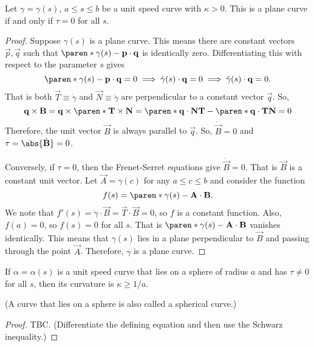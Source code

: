 \documentclass[11pt]{penrose}
\newcommand{\vT}{\vec{T}}
\newcommand{\vN}{\vec{N}}
\newcommand{\vB}{\vec{B}}
\begin{document}

\begin{nthm}
    Let $\gamma = \gamma(s)$, $a \leq s \leq b$ be a unit speed curve with $\kappa > 0$. This is a plane curve if and only if $\tau = 0$ for all $s$.
\end{nthm}
\begin{proof}
    Suppose $\gamma(s)$ is a plane curve. This means there are constant vectors $\vec{p}, \vec{q}$ such that $\paren*{\gamma(s) - \vec{p}} \cdot \vec{q}$ is identically zero. Differentiating this with respect to the parameter $s$ gives
    \begin{equation}
        \paren*{\gamma(s) - \vec{p}} \cdot \vec{q} = 0
        \implies
        \dot{\gamma}(s) \cdot \vec{q} = 0
        \implies
        \ddot{\gamma}(s) \cdot \vec{q} = 0.
    \end{equation}
    That is both $\vT \equiv \dot{\gamma}$ and $\vN \equiv \ddot{\gamma}$ are perpendicular to a constant vector $\vec{q}$. So,
    \begin{equation}
         \vec{q} \times \vB
        = \vec{q} \times \paren*{\vT \times \vN}
        = \paren*{\vec{q} \cdot \vN} \vT - \paren*{\vec{q} \cdot \vT} \vN
        = 0
    \end{equation}
    Therefore, the unit vector $\vB$ is always parallel to $\vec{q}$. So, $\dot{\vB} = 0$ and $\tau = \abs{\dot{\vB}} = 0$.

    Conversely, if $\tau = 0$, then the Frenet-Serret equations give $\dot{\vB} = 0$. That is $\vB$ is a constant unit vector. Let $\vec{A} = \gamma(c)$ for any $a \leq c \leq b$ and consider the function
    \begin{equation}
        f(s) = \paren*{\gamma(s) - \vec{A}} \cdot \vB.
    \end{equation}
    We note that $f'(s) = \dot{\gamma} \cdot \vB = \vT \cdot \vB = 0$, so $f$ is a constant function. Also, $f(a) = 0$, so $f(s) = 0$ for all $s$. That is $\paren*{\gamma(s) - \vec{A}} \cdot \vB$ vanishes identically. This means that $\gamma(s)$ lies in a plane perpendicular to $\vB$ and passing through the point $\vec{A}$. Therefore, $\gamma$ is a plane curve.
\end{proof}

\begin{nthm}
    If $\alpha = \alpha(s)$ is a unit speed curve that lies on a sphere of radius $a$ and has $\tau \neq 0$ for all $s$, then its curvature is $\kappa \geq 1/a$.

    (A curve that lies on a sphere is also called a spherical curve.)
\end{nthm}
\begin{proof}
    TBC. (Differentiate the defining equation and then use the Schwarz inequality.)
\end{proof}
\end{document}
